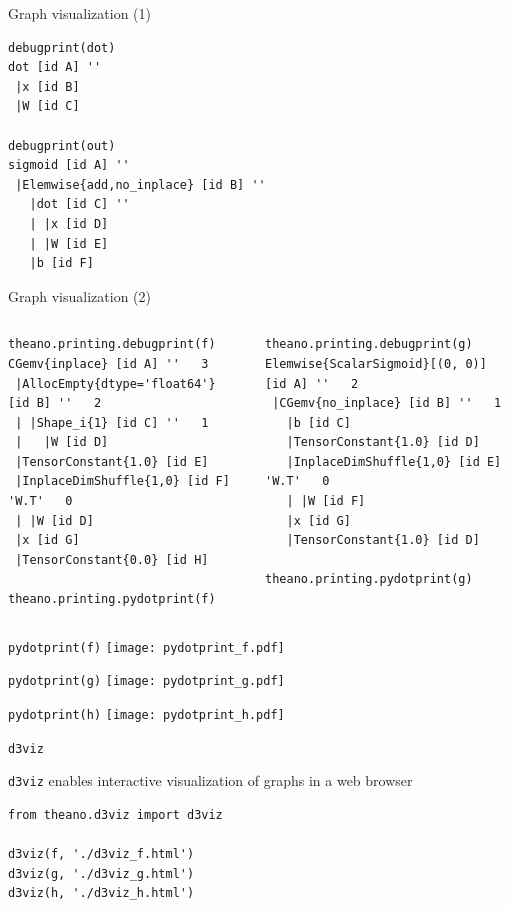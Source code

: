 \documentclass[a4paper,9pt]{beamer}
\begin{document}
\begin{frame}[fragile]{Graph visualization (1)}
  \begin{verbatim}
debugprint(dot)
dot [id A] ''   
 |x [id B]
 |W [id C]

debugprint(out)
sigmoid [id A] ''   
 |Elemwise{add,no_inplace} [id B] ''   
   |dot [id C] ''   
   | |x [id D]
   | |W [id E]
   |b [id F]
  \end{verbatim}
\end{frame}

\begin{frame}[fragile]{Graph visualization (2)}
  \begin{columns}
    \begin{column}{0.48\textwidth}
\footnotesize
      \begin{verbatim}
theano.printing.debugprint(f)
CGemv{inplace} [id A] ''   3
 |AllocEmpty{dtype='float64'} [id B] ''   2
 | |Shape_i{1} [id C] ''   1
 |   |W [id D]
 |TensorConstant{1.0} [id E]
 |InplaceDimShuffle{1,0} [id F] 'W.T'   0
 | |W [id D]
 |x [id G]
 |TensorConstant{0.0} [id H]

theano.printing.pydotprint(f)
      \end{verbatim}
    \end{column}
    \begin{column}{0.48\textwidth}
\footnotesize
      \begin{verbatim}
theano.printing.debugprint(g)
Elemwise{ScalarSigmoid}[(0, 0)] [id A] ''   2
 |CGemv{no_inplace} [id B] ''   1
   |b [id C]
   |TensorConstant{1.0} [id D]
   |InplaceDimShuffle{1,0} [id E] 'W.T'   0
   | |W [id F]
   |x [id G]
   |TensorConstant{1.0} [id D]

theano.printing.pydotprint(g)
      \end{verbatim}
    \end{column}
  \end{columns}
\end{frame}

\begin{frame}{\tt pydotprint(f)}
    \texttt{[image: pydotprint\_f.pdf]}
\end{frame}
\begin{frame}{\tt pydotprint(g)}
    \texttt{[image: pydotprint\_g.pdf]}
\end{frame}
\begin{frame}{\tt pydotprint(h)}
    \texttt{[image: pydotprint\_h.pdf]}
\end{frame}

\begin{frame}[fragile]{\tt d3viz}

{\tt d3viz} enables interactive visualization of graphs in a web browser

  \begin{verbatim}
from theano.d3viz import d3viz

d3viz(f, './d3viz_f.html')
d3viz(g, './d3viz_g.html')
d3viz(h, './d3viz_h.html')
  \end{verbatim}
\end{frame}
\end{document}

